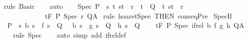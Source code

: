 \begin{isabellebody}
\ {\isacharparenleft}rule\ Basic{\isacharparenright}\isanewline
\ \ \isamarkupfalse%
\ auto\isanewline
\ \ \isamarkupfalse%
%
\endisatagproof
{\isafoldproof}%
%
\isadelimproof
\isanewline
%
\endisadelimproof
\isanewline
{}\isamarkupfalse%
\ Spec{\isacharcolon}\ {\isachardoublequoteopen}P\ {\isasymsubseteq}\ {\isacharbraceleft}s{\isachardot}\ {\isacharparenleft}{\isasymforall}t{\isachardot}\ {\isacharparenleft}s{\isacharcomma}t{\isacharparenright}\ {\isasymin}\ r\ {\isasymlongrightarrow}\ t\ {\isasymin}\ Q{\isacharparenright}\ {\isasymand}\ {\isacharparenleft}{\isasymexists}t{\isachardot}\ {\isacharparenleft}s{\isacharcomma}t{\isacharparenright}\ {\isasymin}\ r{\isacharparenright}{\isacharbraceright}\ \isanewline
\ \ \ \ \ \ \ \ \ \ \ \ {\isasymLongrightarrow}\ {\isasymGamma}{\isacharcomma}{\isasymTheta}{\isasymturnstile}\isactrlsub t\isactrlbsub {\isacharslash}F\isactrlesub \ P\ {\isacharparenleft}Spec\ r{\isacharparenright}\ Q{\isacharcomma}A{\isachardoublequoteclose}\isanewline
%
\isadelimproof
%
\endisadelimproof
%
\isatagproof
{}\isamarkupfalse%
\ {\isacharparenleft}rule\ hoaret{\isachardot}Spec\ {\isacharbrackleft}THEN\ conseqPre{\isacharbrackright}{\isacharparenright}%
\endisatagproof
{\isafoldproof}%
%
\isadelimproof
\isanewline
%
\endisadelimproof
\isanewline
{}\isamarkupfalse%
\ SpecIf{\isacharcolon}\ \isanewline
\ \ {\isachardoublequoteopen}{\isasymlbrakk}P\ {\isasymsubseteq}\ {\isacharbraceleft}s{\isachardot}\ {\isacharparenleft}b\ s\ {\isasymlongrightarrow}\ f\ s\ {\isasymin}\ Q{\isacharparenright}\ {\isasymand}\ {\isacharparenleft}{\isasymnot}\ b\ s\ {\isasymlongrightarrow}\ g\ s\ {\isasymin}\ Q\ {\isasymand}\ h\ s\ {\isasymin}\ Q{\isacharparenright}{\isacharbraceright}{\isasymrbrakk}\ {\isasymLongrightarrow}\isanewline
\ \ \ {\isasymGamma}{\isacharcomma}{\isasymTheta}{\isasymturnstile}\isactrlsub t\isactrlbsub {\isacharslash}F\isactrlesub \ P\ Spec\ {\isacharparenleft}if{\isacharunderscore}rel\ b\ f\ g\ h{\isacharparenright}\ Q{\isacharcomma}A{\isachardoublequoteclose}\isanewline
%
\isadelimproof
\ \ %
\endisadelimproof
%
\isatagproof
{}\isamarkupfalse%
\ {\isacharparenleft}rule\ Spec{\isacharparenright}\isanewline
\ \ \isamarkupfalse%
\ {\isacharparenleft}auto\ simp\ add{\isacharcolon}\ if{\isacharunderscore}rel{\isacharunderscore}def{\isacharparenright}\isanewline
\ \ \isamarkupfalse%
%
\endisatagproof
{\isafoldproof}%
%
\isadelimproof
\isanewline
%
\endisadelimproof
\isanewline
{}\isamarkupfalse%

\end{isabellebody}
